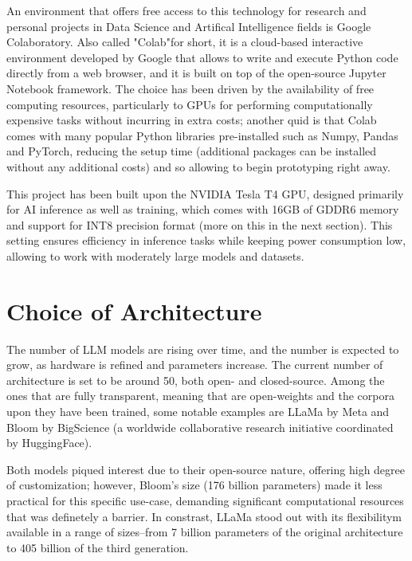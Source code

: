 An environment that offers free access to this technology for research and personal projects in Data Science and Artifical Intelligence fields is Google Colaboratory. \cite{colab2025} Also called "Colab"for short, it is a cloud-based interactive environment developed by Google that allows to write and execute Python code directly from a web browser, and it is built on top of the open-source Jupyter Notebook framework. The choice has been driven by the availability of free computing resources, particularly to GPUs for performing computationally expensive tasks without incurring in extra costs; another quid is that Colab comes with many popular Python libraries pre-installed such as Numpy, Pandas and PyTorch, reducing the setup time (additional packages can be installed without any additional costs) and so allowing to begin prototyping right away.

This project has been built upon the NVIDIA Tesla T4 GPU, designed primarily for AI inference as well as training, which comes with 16GB of GDDR6 memory and support for INT8 precision format (more on this in the next section). This setting ensures efficiency in inference tasks while keeping power consumption low, allowing to work with moderately large models and datasets. \cite{nvidia2025}


\section{Choice of Architecture}
\label{sec:architecture-choice}

The number of LLM models are rising over time, and the number is expected to grow, as hardware is refined and parameters increase. The current number of architecture is set to be around 50, both open- and closed-source. Among the ones that are fully transparent, meaning that are open-weights and the corpora upon they have been trained, some notable examples are LLaMa by Meta \cite{touvron2023llama} and Bloom by BigScience (a worldwide collaborative research initiative coordinated by HuggingFace). \cite{scao2022bloom}

Both models piqued interest due to their open-source nature, offering high degree of customization; however, Bloom's size (176 billion parameters) made it less practical for this specific use-case, demanding significant computational resources that was definetely a barrier. In constrast, LLaMa stood out with its flexibilitym available in a range of sizes--from 7 billion parameters of the original architecture to 405 billion of the third generation.

